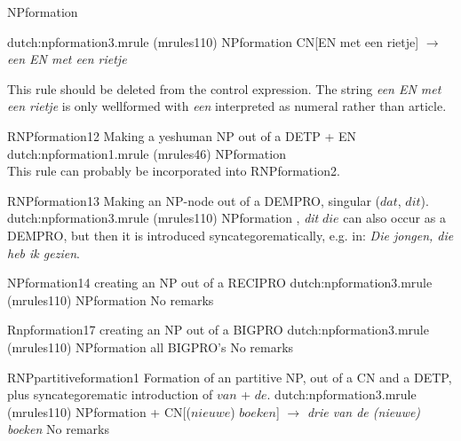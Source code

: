 \begin{mruleclass}{NPformation}
\begin{members}
\begin{member}
\file dutch:npformation3.mrule (mrules110)
\semantics NPformation
\example
         CN[EN met een rietje]
$\rightarrow$  
{\em een EN met een rietje}

\remarks This rule should be deleted from the control expression. 
The string
{\em een EN met een rietje} is only wellformed with {\em een} interpreted as 
numeral rather than article.
\end{member}


\begin{member}
 RNPformation12
 Making a yeshuman NP out of a DETP + EN 
\file dutch:npformation1.mrule (mrules46)
\semantics NPformation
\\
\remarks\mbox{}
This rule can probably be incorporated into RNPformation2.\\

\end{member}

\begin{member}
 RNPformation13
 Making an NP-node out of a DEMPRO, singular ($dat$, $dit$).
\file dutch:npformation3.mrule (mrules110)
\semantics NPformation
, {\em dit}
\remarks 
$die$ can also occur as a DEMPRO, but then it is introduced 
syncategorematically, e.g. in: 
{\em  Die jongen, {\em die} heb ik gezien}.
\end{member}
\begin{member}
 NPformation14
 creating an NP out of a  RECIPRO
\file dutch:npformation3.mrule (mrules110)
\semantics NPformation
\remarks No remarks
\end{member}

\begin{member}
 Rnpformation17
{} creating an NP out of a BIGPRO
\file dutch:npformation3.mrule (mrules110)
\semantics NPformation
\example all BIGPRO's
\remarks No remarks
\end{member}

\begin{member}
 RNPpartitiveformation1
 Formation of an partitive NP, out of a CN and a DETP, plus
syncategorematic introduction of $van$ + $de$. 
\file dutch:npformation3.mrule (mrules110)
\semantics NPformation
 + CN[($nieuwe$) $boeken$] $\rightarrow$ {\em 
drie van de (nieuwe) 
boeken}
\remarks No remarks


\end{member}
\end{members}
\end{mruleclass}
